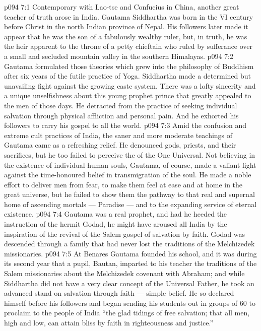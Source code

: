 \vs p094 7:1 Contemporary with Lao\hyp{}tse and Confucius in China, another great teacher of truth arose in India. Gautama Siddhartha was born in the VI century before Christ in the north Indian province of Nepal. His followers later made it appear that he was the son of a fabulously wealthy ruler, but, in truth, he was the heir apparent to the throne of a petty chieftain who ruled by sufferance over a small and secluded mountain valley in the southern Himalayas.
\vs p094 7:2 Gautama formulated those theories which grew into the philosophy of Buddhism after six years of the futile practice of Yoga. Siddhartha made a determined but unavailing fight against the growing caste system. There was a lofty sincerity and a unique unselfishness about this young prophet prince that greatly appealed to the men of those days. He detracted from the practice of seeking individual salvation through physical affliction and personal pain. And he exhorted his followers to carry his gospel to all the world.
\vs p094 7:3 Amid the confusion and extreme cult practices of India, the saner and more moderate teachings of Gautama came as a refreshing relief. He denounced gods, priests, and their sacrifices, but he too failed to perceive the  of the One Universal. Not believing in the existence of individual human souls, Gautama, of course, made a valiant fight against the time\hyp{}honoured belief in transmigration of the soul. He made a noble effort to deliver men from fear, to make them feel at ease and at home in the great universe, but he failed to show them the pathway to that real and supernal home of ascending mortals --- Paradise --- and to the expanding service of eternal existence.
\vs p094 7:4 Gautama was a real prophet, and had he heeded the instruction of the hermit Godad, he might have aroused all India by the inspiration of the revival of the Salem gospel of salvation by faith. Godad was descended through a family that had never lost the traditions of the Melchizedek missionaries.
\vs p094 7:5 At Benares Gautama founded his school, and it was during its second year that a pupil, Bautan, imparted to his teacher the traditions of the Salem missionaries about the Melchizedek covenant with Abraham; and while Siddhartha did not have a very clear concept of the Universal Father, he took an advanced stand on salvation through faith --- simple belief. He so declared himself before his followers and began sending his students out in groups of 60 to proclaim to the people of India “the glad tidings of free salvation; that all men, high and low, can attain bliss by faith in righteousness and justice.”
